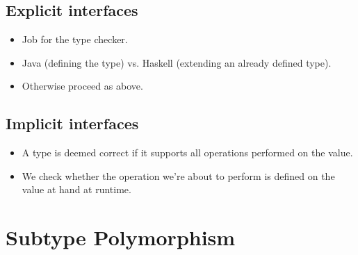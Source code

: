 \subsection{Explicit interfaces}

\begin{itemize}

\item Job for the type checker.

\item Java (defining the type) vs. Haskell (extending an already defined type).

\item Otherwise proceed as above.

\end{itemize}

\subsection{Implicit interfaces}

\begin{itemize}

\item A type is deemed correct if it supports all operations performed on the
value.

\item We check whether the operation we're about to perform is defined on the
value at hand at runtime.

\end{itemize}

\section{Subtype Polymorphism}

